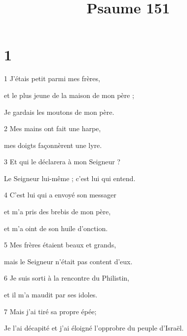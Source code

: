 

\title{Psaume 151}

\chapter{1}

\par 1 J'étais petit parmi mes frères,
\par     et le plus jeune de la maison de mon père ;
\par     Je gardais les moutons de mon père.
\par 2 Mes mains ont fait une harpe,
\par     mes doigts façonnèrent une lyre.
\par 3 Et qui le déclarera à mon Seigneur ?
\par     Le Seigneur lui-même ; c'est lui qui entend.
\par 4 C'est lui qui a envoyé son messager
\par     et m'a pris des brebis de mon père,
\par     et m'a oint de son huile d'onction.
\par 5 Mes frères étaient beaux et grands,
\par     mais le Seigneur n'était pas content d'eux.
\par 6 Je suis sorti à la rencontre du Philistin,
\par     et il m'a maudit par ses idoles.
\par 7 Mais j'ai tiré sa propre épée;
\par     Je l'ai décapité et j'ai éloigné l'opprobre du peuple d'Israël.

